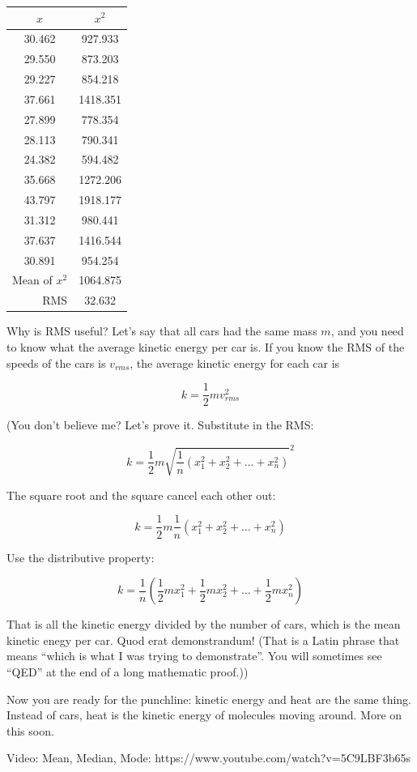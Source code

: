 \begin{tabular}{c |  c}
  $x$ & $x^2$ \\
  \hline
30.462 & 927.933 \\
29.550 & 873.203\\
29.227 & 854.218\\
37.661 & 1418.351\\
27.899 & 778.354\\
28.113 & 790.341\\
24.382 & 594.482\\
35.668 & 1272.206\\
43.797 & 1918.177\\
31.312 & 980.441\\
37.637 & 1416.544\\
30.891 & 954.254\\
\hline
\multicolumn{1}{r}{Mean of $x^2$} & {1064.875}\\
\multicolumn{1}{r}{RMS} & {32.632}
  \end{tabular}

Why is RMS useful? Let's say that all cars had the same mass $m$, and
you need to know what the average kinetic energy per car is. If you
know the RMS of the speeds of the cars is $v_{rms}$, the average kinetic energy for
each car is

$$k = \frac{1}{2}m v_{rms}^2$$

(You don't believe me? Let's prove it. Substitute in the RMS:

$$k = \frac{1}{2}m \sqrt{\frac{1}{n}\left( x_1^2 + x_2^2 + \ldots + x_n^2 \right)}^2$$

The square root and the square cancel each other out:

$$k = \frac{1}{2}m \frac{1}{n}\left( x_1^2 + x_2^2 + \ldots + x_n^2 \right)$$

Use the distributive property:

$$k = \frac{1}{n} \left( \frac{1}{2} m x_1^2 + \frac{1}{2}m x_2^2 + \ldots + \frac{1}{2}m x_n^2 \right)$$


That is all the kinetic energy divided by the number of cars, which is
the mean kinetic enegy per car. Quod erat demonstrandum! (That is a
Latin phrase that means ``which is what I was trying to
demonstrate''. You will sometimes see ``QED'' at the end of a long
mathematic proof.))

Now you are ready for the punchline: kinetic energy and heat are the
same thing. Instead of cars, heat is the kinetic energy of molecules
moving around. More on this soon.

Video: Mean, Median, Mode: https://www.youtube.com/watch?v=5C9LBF3b65s


